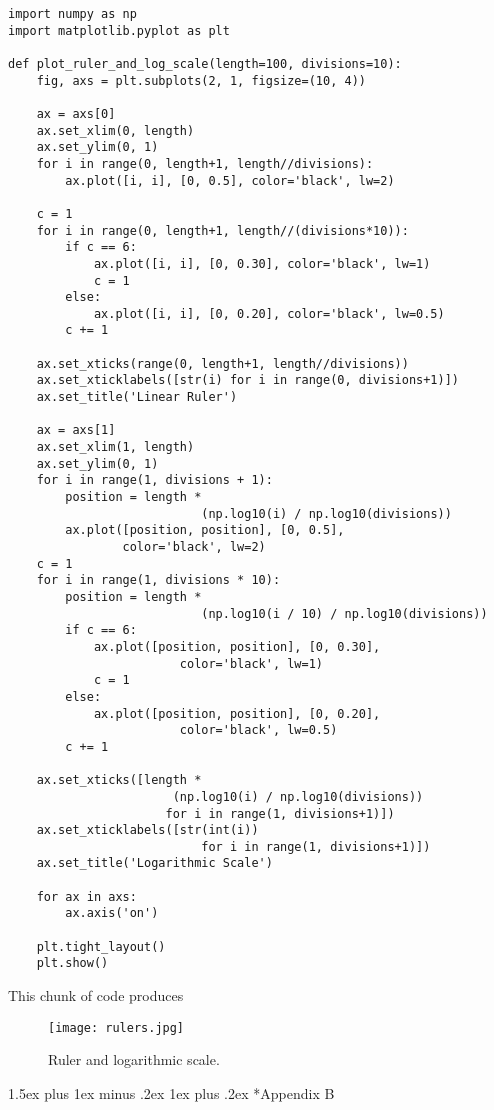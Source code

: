 \documentclass[10pt,twocolumn]{article}
\makeatletter
\renewcommand\section{%
  \@startsection{section}{1}{0pt}%
  {1.5ex plus 1ex minus .2ex}%
  {1ex plus .2ex}%
  {\normalfont\normalsize\bfseries}} %
\makeatother
\begin{document}
\small
\begin{verbatim}
import numpy as np
import matplotlib.pyplot as plt

def plot_ruler_and_log_scale(length=100, divisions=10):
    fig, axs = plt.subplots(2, 1, figsize=(10, 4))

    ax = axs[0]
    ax.set_xlim(0, length)
    ax.set_ylim(0, 1)
    for i in range(0, length+1, length//divisions):
        ax.plot([i, i], [0, 0.5], color='black', lw=2)

    c = 1
    for i in range(0, length+1, length//(divisions*10)):
        if c == 6:
            ax.plot([i, i], [0, 0.30], color='black', lw=1)
            c = 1
        else:
            ax.plot([i, i], [0, 0.20], color='black', lw=0.5)
        c += 1

    ax.set_xticks(range(0, length+1, length//divisions))
    ax.set_xticklabels([str(i) for i in range(0, divisions+1)])
    ax.set_title('Linear Ruler')

    ax = axs[1]
    ax.set_xlim(1, length)
    ax.set_ylim(0, 1)
    for i in range(1, divisions + 1):
        position = length * 
				           (np.log10(i) / np.log10(divisions))
        ax.plot([position, position], [0, 0.5], 
				color='black', lw=2)
    c = 1
    for i in range(1, divisions * 10):
        position = length * 
				           (np.log10(i / 10) / np.log10(divisions))
        if c == 6:
            ax.plot([position, position], [0, 0.30], 
						color='black', lw=1)
            c = 1
        else:
            ax.plot([position, position], [0, 0.20], 
						color='black', lw=0.5)
        c += 1

    ax.set_xticks([length * 
		               (np.log10(i) / np.log10(divisions)) 
		              for i in range(1, divisions+1)])
    ax.set_xticklabels([str(int(i)) 
		                   for i in range(1, divisions+1)])
    ax.set_title('Logarithmic Scale')

    for ax in axs:
        ax.axis('on')

    plt.tight_layout()
    plt.show()
\end{verbatim}


This chunk of code produces

\begin{figure}[h]
  \centering
  \texttt{[image: rulers.jpg]}  %
  \caption{Ruler and logarithmic scale.}
  \label{fig:rulers}
\end{figure}

\section*{Appendix B}
\end{document}
